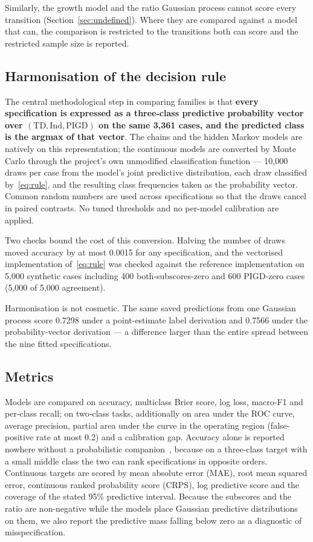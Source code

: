 \documentclass[11pt]{article}
\newcommand{\TD}{\mathrm{TD}}
\newcommand{\PIGD}{\mathrm{PIGD}}
\newcommand{\Ind}{\mathrm{Ind}}
\begin{document}
Similarly, the growth model and the ratio Gaussian process cannot score every
transition (Section~\ref{sec:undefined}). Where they are compared against a model
that can, the comparison is restricted to the transitions both can score and the
restricted sample size is reported.

\subsection{Harmonisation of the decision rule}
\label{sec:harmonisation}
The central methodological step in comparing families is that \textbf{every
specification is expressed as a three-class predictive probability vector over
$(\TD, \Ind, \PIGD)$ on the same 3,361 cases, and the predicted class is the
argmax of that vector}. The chains and the hidden Markov models are natively on
this representation; the continuous models are converted by Monte Carlo through
the project's own unmodified classification function --- 10,000 draws per case
from the model's joint predictive distribution, each draw classified
by~\eqref{eq:rule}, and the resulting class frequencies taken as the probability
vector. Common random numbers are used across specifications so that the draws
cancel in paired contrasts. No tuned thresholds and no per-model calibration are
applied.

Two checks bound the cost of this conversion. Halving the number of draws moved
accuracy by at most 0.0015 for any specification, and the vectorised
implementation of~\eqref{eq:rule} was checked against the reference
implementation on 5,000 synthetic cases including 400 both-subscores-zero and 600
PIGD-zero cases (5,000 of 5,000 agreement).

Harmonisation is not cosmetic. The same saved predictions from one Gaussian
process score 0.7298 under a point-estimate label derivation and 0.7566 under the
probability-vector derivation --- a difference larger than the entire spread
between the nine fitted specifications.

\subsection{Metrics}
Models are compared on accuracy, multiclass Brier score, log loss, macro-F1 and
per-class recall; on two-class tasks, additionally on area under the ROC curve,
average precision, partial area under the curve in the operating region
(false-positive rate at most 0.2) and a calibration gap. Accuracy alone is
reported nowhere without a probabilistic companion~\citep{gneiting2007,
vancalster2019}, because on a three-class target with a small middle class the
two can rank specifications in opposite orders. Continuous targets are scored by
mean absolute error (MAE), root mean squared error, continuous ranked probability
score (CRPS), log predictive score and the coverage of the stated 95\% predictive
interval. Because the subscores and the ratio are non-negative while the models
place Gaussian predictive distributions on them, we also report the predictive
mass falling below zero as a diagnostic of misspecification.
\end{document}
